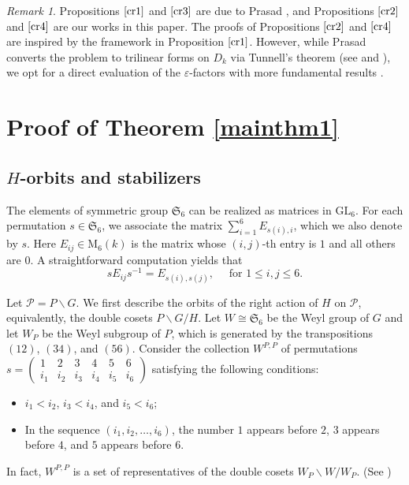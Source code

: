 \documentclass[12pt]{amsart}
\newcommand{\GL}{{\mathrm{GL}}}
\theoremstyle{Theorem}
\theoremstyle{Theorem}
\theoremstyle{Theorem}
\theoremstyle{Theorem}
\theoremstyle{Plain}
\theoremstyle{remark}
\theoremstyle{remark}
\theoremstyle{Definition}
\newtheorem{remarkd}[dfn]{Remark}
\begin{document}
\begin{remarkd}
    Propositions $\ref{cr1}$ and $\ref{cr3}$ are due to Prasad \cite{Prasad}, and Propositions $\ref{cr2}$ and $\ref{cr4}$ are our works in this paper. The proofs of Propositions $\ref{cr2}$ and $\ref{cr4}$ are inspired by the framework in Proposition $\ref{cr1}$. However, while Prasad converts the problem to trilinear forms on $D_k$ via Tunnell's theorem (see \cite[Theorem 8.3]{Prasad} and \cite{Tunnell}), we opt for a direct evaluation of the $\varepsilon$-factors with more fundamental results \cite[Theorems 1.2 and 1.4]{Tunnell}.
\end{remarkd}

\section{Proof of Theorem \ref{mainthm1}}

\subsection{$H$-orbits and stabilizers}

The elements of symmetric group $ \mathfrak{S}_6 $ can be realized as matrices in $\GL_6$. For each permutation $ s \in \mathfrak{S}_6 $, we associate the matrix $ \sum_{i = 1}^6 E_{ s(i), i } $, which we also denote by $s$. Here $ E_{ij} \in \mathrm{M}_6(k) $ is the matrix whose $(i, j)$-th entry is $1$ and all others are $0$. A straightforward computation yields that
\[
    s E_{ij} s^{-1} = E_{ s(i), s(j) }, \quad \text{ for } 1 \le i, j \le 6.
\]

Let $ \mathcal{P} = P \backslash G $. We first describe the orbits of the right action of $H$ on $\mathcal{P}$, equivalently, the double cosets $ P \backslash G/H $. Let $ W \cong \mathfrak{S}_6 $ be the Weyl group of $G$ and let $W_P$ be the Weyl subgroup of $P$, which is generated by the transpositions $(12)$, $(34)$, and $(56)$. 
Consider the collection $W^{P, P}$ of permutations $ s =
\begin{pmatrix}
    1   & 2   & 3   & 4   & 5   & 6  \\
    i_1 & i_2 & i_3 & i_4 & i_5 & i_6
\end{pmatrix} $
satisfying the following conditions:
\begin{itemize}
    \item[(a)]  $ i_1 < i_2 $, $ i_3 < i_4 $, and $ i_5 < i_6 $;
    \item[(b)]  In the sequence $ ( i_1, i_2, \dots, i_6 ) $, the number $1$ appears before $2$, $3$ appears before $4$, and $5$ appears before $6$. 
\end{itemize}
In fact, $W^{P, P}$ is a set of representatives of the double cosets $ W_P \backslash W / W_P $. (See \cite[Lemma 2.11]{B-Z})
\end{document}

